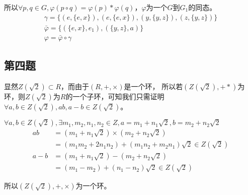 \documentclass[12pt,onecolumn]{article}
\theoremstyle{plain}
\begin{document}
\begin{proof*}
  所以$\forall p, q \in G, \varphi(p \circ q) = \varphi(p) * \varphi(q)$，$\varphi$为一个$G$到$G_1$的同态。
  \begin{gather*}
    \gamma = \{(e, \{e, x\}), (e, \{e, x\}), (y, \{y, z\}), (z, \{y, z\}) \} \\
    \bar{\varphi} = \{(\{e, x\}, e_1), (\{y, z\}, a) \} \\
    \varphi = \bar{\varphi} \circ \gamma
  \end{gather*}
\end{proof*}

\subsection{第四题}
\begin{proof*}
  显然$Z(\sqrt{2}) \subset R$，而由于$(R, +, \times)$是一个环，
  所以若$(Z(\sqrt{2}), + *)$为环，则$Z(\sqrt{2})$为$R$的一个子环，可知我们只需证明$\forall a, b \in Z(\sqrt{2}), ab, a - b \in Z(\sqrt{2})$。

  $\forall a, b \in Z(\sqrt{2}), \exists m_1, m_2, n_1, n_2 \in Z, a = m_1 + n_1\sqrt{2}, b = m_2 + n_2\sqrt{2}$
  \begin{align*}
    ab    & = (m_1 + n_1\sqrt{2}) \times (m_2 + n_2\sqrt{2}) \\
          & = (m_1m_2 + 2n_1n_2) + (m_1n_2 + m_2n_1)\sqrt{2} \in Z(\sqrt{2}) \\
    a - b & = (m_1 + n_1\sqrt{2}) - (m_2 + n_2\sqrt{2}) \\
          & = (m_1 - m_2) + (n_1 - n_2)\sqrt{2} \in Z(\sqrt{2})
  \end{align*}

  所以$(Z(\sqrt{2}), +, \times)$为一个环。
\end{proof*}
\end{document}
